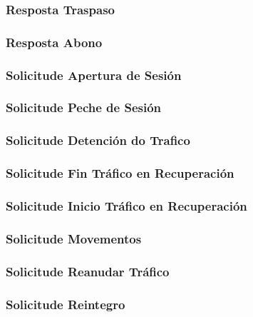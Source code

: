 \documentclass[a4paper,titlepage]{article}
\begin{document}
\subsubsection{Resposta Traspaso}

\subsubsection{Resposta Abono}

\subsubsection{Solicitude Apertura de Sesión}

\subsubsection{Solicitude Peche de Sesión}

\subsubsection{Solicitude Detención do Trafico}

\subsubsection{Solicitude Fin Tráfico en Recuperación}

\subsubsection{Solicitude Inicio Tráfico en Recuperación}

\subsubsection{Solicitude Movementos}

\subsubsection{Solicitude Reanudar Tráfico}

\subsubsection{Solicitude Reintegro}

\end{document}
